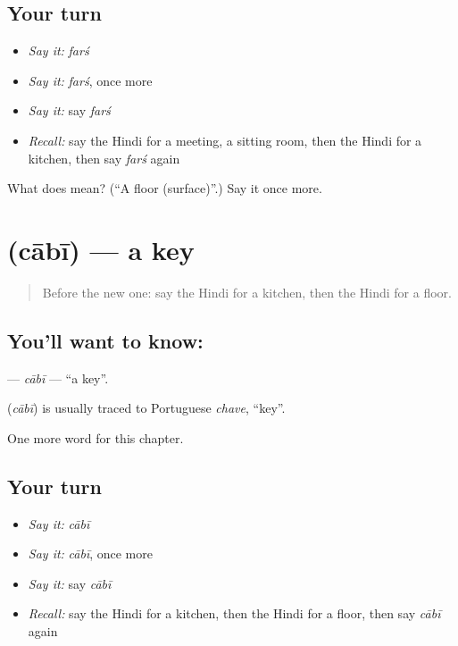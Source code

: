 \subsection*{Your turn}
\begin{itemize}
\raggedright
  \item \emph{Say it:} \emph{farś}
  \item \emph{Say it:} \emph{farś}, once more
  \item \emph{Say it:} say \emph{farś}
  \item \emph{Recall:} say the Hindi for a meeting, a sitting room, then the Hindi for a kitchen, then say \emph{farś} again
\end{itemize}

\begin{tcolorbox}[breakable,colback=teal!4,colframe=teal!35!black,title={Before you move on}]
What does  mean? (\textquotedblleft{}A floor (surface)\textquotedblright{}.) Say it once more.
\end{tcolorbox}
\section[\texorpdfstring{\hi{चाबी} (cābī)}{चाबी (cābī)}]{ (cābī) — a key}

\label{lesson:HI-C184-cabi}



\begin{quote}
Before the new one: say the Hindi for a kitchen, then the Hindi for a floor.
\end{quote}

\subsection*{You'll want to know: }
\textbf{} — \emph{cābī} — \textquotedblleft{}a key\textquotedblright{}.

\begin{cousinweb}
\textbf{} (\emph{cābī}) is usually traced to Portuguese \emph{chave}, \textquotedblleft{}key\textquotedblright{}.
\end{cousinweb}

\begin{grammarlens}[title={What you've built}]
One more word for this chapter.
\end{grammarlens}

\subsection*{Your turn}
\begin{itemize}
\raggedright
  \item \emph{Say it:} \emph{cābī}
  \item \emph{Say it:} \emph{cābī}, once more
  \item \emph{Say it:} say \emph{cābī}
  \item \emph{Recall:} say the Hindi for a kitchen, then the Hindi for a floor, then say \emph{cābī} again
\end{itemize}

